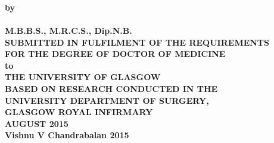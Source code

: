 \documentclass[12pt, oneside]{Thesis} %
\begin{document}
\begin{titlepage}
	\begin{center}
	
	\HRule \\[0.4cm] %
	{\huge \bfseries \ttitle}\\[0.4cm] %
	\HRule \\[1.5cm] %
	
	\begin{minipage}{1\textwidth}
		\begin{center} \large
			\textbf{by} \\
			\vspace{1.1cm}
			\textbf{\authornames}\\
			\textbf{M.B.B.S., M.R.C.S., Dip.N.B.}\\
			\vspace{1.1cm}
			\normalsize
			\textbf{SUBMITTED IN FULFILMENT OF THE REQUIREMENTS}\\
			\textbf{FOR THE DEGREE OF DOCTOR OF MEDICINE}\\
			\vspace{1.1cm}
			\textbf{to}\\
			\vspace{1.1cm}
			\textbf{THE UNIVERSITY OF GLASGOW}\\
			\vspace{1.1cm}
			\textbf{BASED ON RESEARCH CONDUCTED IN THE} \\
			\textbf{UNIVERSITY DEPARTMENT OF SURGERY,}\\
			\textbf{GLASGOW ROYAL INFIRMARY}\\
			\textbf{AUGUST 2015}\\
			\vspace{1.1cm}
			\textcopyright \textbf{Vishnu V Chandrabalan 2015}
		\end{center}	
		
	\end{minipage}
	\vfill
	\end{center}

\end{titlepage}




\pagestyle{empty} %
\end{document}
